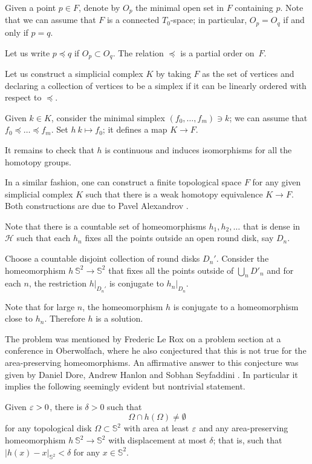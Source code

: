 Given a point $p\in F$,
denote by $O_p$ the minimal open set in $F$ containing $p$. 
Note that we can assume that $F$ is a connected $T_0$-space;
in particular, $O_p=O_q$ if and only if $p=q$.

Let us write $p\preccurlyeq q$ 
if $O_p\subset O_q$.
The relation $\preccurlyeq$ is a partial order on~$F$.

Let us construct a simplicial complex $K$ 
by taking $F$ as the set of vertices
and declaring a collection of vertices to be a simplex 
if it can be linearly ordered with respect to $\preccurlyeq$.

Given $k\in K$,
consider the minimal simplex $(f_0,\dots,f_m)\ni k$;
we can assume that $f_0\preccurlyeq \dots\preccurlyeq f_m$.
Set $h\:k\mapsto f_0$;
it defines a map $K\to F$.

It remains to check that $h$ is continuous 
and induces isomorphisms for all the homotopy groups.
\qeds

In a similar fashion, one can construct a finite topological space $F$ for any given simplicial complex $K$ 
such that 
there is a weak homotopy equivalence $K\to F$.
Both constructions are due to Pavel Alexandrov
\cite{alexandrov-finite,mccord}.

Note that there is a countable set of homeomorphisms $h_1,h_2,\dots$ that is dense in $\mathcal{H}$
such that
each $h_n$ fixes all the points outside an open round disk, say $D_n$.

Choose a countable disjoint collection of round disks $D_n'$.
Consider the homeomorphism $h\:\mathbb S^2\to \mathbb S^2$
that fixes all the points outside of $\bigcup_nD'_n$ and
for each $n$,
the restriction $h|_{D_n'}$ is conjugate to $h_n|_{D_n}$. 


Note that for large $n$, the homeomorphism $h$ is conjugate to a homeomorphism close to $h_n$.
Therefore $h$ is a solution.
\qeds

The problem was mentioned by Frederic Le Rox \cite{rox} on a problem section at a conference in Oberwolfach, 
where he also conjectured that this is not true for the area-preserving homeomorphisms.
An affirmative answer to this conjecture was given by Daniel Dore, Andrew Hanlon and Sobhan Seyfaddini 
\cite{dore-hanlon,seyfaddini}.
In particular it implies the following seemingly evident but nontrivial statement.

\begin{pr}
Given $\varepsilon>0$, there is $\delta>0$ such that 
\[\Omega\cap h(\Omega)\ne\emptyset\]
for any topological disk $\Omega\subset \mathbb{S}^2$ with area at least $\varepsilon$
and 
any area-preserving homeomorphism $h\:\mathbb{S}^2\to\mathbb{S}^2$ with displacement at most $\delta$;
that is, such that $|h(x)-x|_{\mathbb{S}^2}<\delta$ for any $x\in \mathbb{S}^2$. 
\end{pr}


